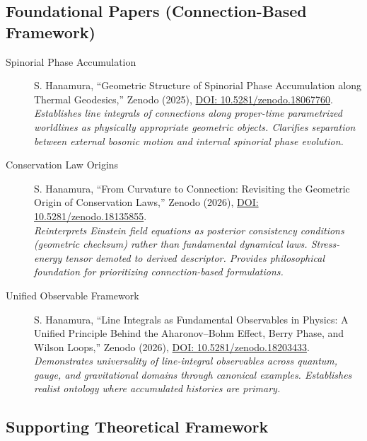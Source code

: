 \documentclass[12pt,letterpaper]{article}
\begin{document}
\subsection*{Foundational Papers (Connection-Based Framework)}

\begin{description}
\item[Spinorial Phase Accumulation] S. Hanamura, ``Geometric Structure of Spinorial Phase Accumulation along Thermal Geodesics,'' Zenodo (2025), \href{https://doi.org/10.5281/zenodo.18067760}{DOI: 10.5281/zenodo.18067760}. \\
\textit{Establishes line integrals of connections along proper-time parametrized worldlines as physically appropriate geometric objects. Clarifies separation between external bosonic motion and internal spinorial phase evolution.}

\item[Conservation Law Origins] S. Hanamura, ``From Curvature to Connection: Revisiting the Geometric Origin of Conservation Laws,'' Zenodo (2026), \href{https://doi.org/10.5281/zenodo.18135855}{DOI: 10.5281/zenodo.18135855}. \\
\textit{Reinterprets Einstein field equations as posterior consistency conditions (geometric checksum) rather than fundamental dynamical laws. Stress-energy tensor demoted to derived descriptor. Provides philosophical foundation for prioritizing connection-based formulations.}

\item[Unified Observable Framework] S. Hanamura, ``Line Integrals as Fundamental Observables in Physics: A Unified Principle Behind the Aharonov--Bohm Effect, Berry Phase, and Wilson Loops,'' Zenodo (2026), \href{https://doi.org/10.5281/zenodo.18203433}{DOI: 10.5281/zenodo.18203433}. \\
\textit{Demonstrates universality of line-integral observables across quantum, gauge, and gravitational domains through canonical examples. Establishes realist ontology where accumulated histories are primary.}
\end{description}

\subsection*{Supporting Theoretical Framework}
\end{document}
